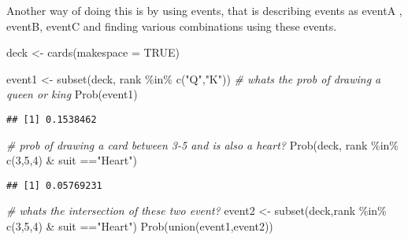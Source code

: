 \documentclass[
]{article}
\newenvironment{Shaded}{\begin{snugshade}}{\end{snugshade}}
\newcommand{\AttributeTok}[1]{\textcolor[rgb]{0.77,0.63,0.00}{#1}}
\newcommand{\CommentTok}[1]{\textcolor[rgb]{0.56,0.35,0.01}{\textit{#1}}}
\newcommand{\ConstantTok}[1]{\textcolor[rgb]{0.00,0.00,0.00}{#1}}
\newcommand{\DecValTok}[1]{\textcolor[rgb]{0.00,0.00,0.81}{#1}}
\newcommand{\FunctionTok}[1]{\textcolor[rgb]{0.00,0.00,0.00}{#1}}
\newcommand{\NormalTok}[1]{#1}
\newcommand{\OtherTok}[1]{\textcolor[rgb]{0.56,0.35,0.01}{#1}}
\newcommand{\SpecialCharTok}[1]{\textcolor[rgb]{0.00,0.00,0.00}{#1}}
\newcommand{\StringTok}[1]{\textcolor[rgb]{0.31,0.60,0.02}{#1}}
\begin{document}
Another way of doing this is by using events, that is describing events
as eventA , eventB, eventC and finding various combinations using these
events.

\begin{Shaded}
\begin{Highlighting}[]
\NormalTok{deck }\OtherTok{\textless{}{-}} \FunctionTok{cards}\NormalTok{(}\AttributeTok{makespace =} \ConstantTok{TRUE}\NormalTok{)}

\NormalTok{event1 }\OtherTok{\textless{}{-}} \FunctionTok{subset}\NormalTok{(deck, rank }\SpecialCharTok{\%in\%} \FunctionTok{c}\NormalTok{(}\StringTok{"Q"}\NormalTok{,}\StringTok{"K"}\NormalTok{))}
\CommentTok{\# whats the prob of drawing a queen or king}
\FunctionTok{Prob}\NormalTok{(event1)}
\end{Highlighting}
\end{Shaded}

\begin{verbatim}
## [1] 0.1538462
\end{verbatim}

\begin{Shaded}
\begin{Highlighting}[]
\CommentTok{\# prob of drawing a card between 3{-}5 and is also a heart?}
\FunctionTok{Prob}\NormalTok{(deck, rank }\SpecialCharTok{\%in\%} \FunctionTok{c}\NormalTok{(}\DecValTok{3}\NormalTok{,}\DecValTok{5}\NormalTok{,}\DecValTok{4}\NormalTok{) }\SpecialCharTok{\&}\NormalTok{ suit }\SpecialCharTok{==}\StringTok{"Heart"}\NormalTok{)}
\end{Highlighting}
\end{Shaded}

\begin{verbatim}
## [1] 0.05769231
\end{verbatim}

\begin{Shaded}
\begin{Highlighting}[]
\CommentTok{\# whats the intersection of these two event?}
\NormalTok{event2 }\OtherTok{\textless{}{-}} \FunctionTok{subset}\NormalTok{(deck,rank }\SpecialCharTok{\%in\%} \FunctionTok{c}\NormalTok{(}\DecValTok{3}\NormalTok{,}\DecValTok{5}\NormalTok{,}\DecValTok{4}\NormalTok{) }\SpecialCharTok{\&}\NormalTok{ suit }\SpecialCharTok{==}\StringTok{"Heart"}\NormalTok{)}
\FunctionTok{Prob}\NormalTok{(}\FunctionTok{union}\NormalTok{(event1,event2))}
\end{Highlighting}
\end{Shaded}
\end{document}
